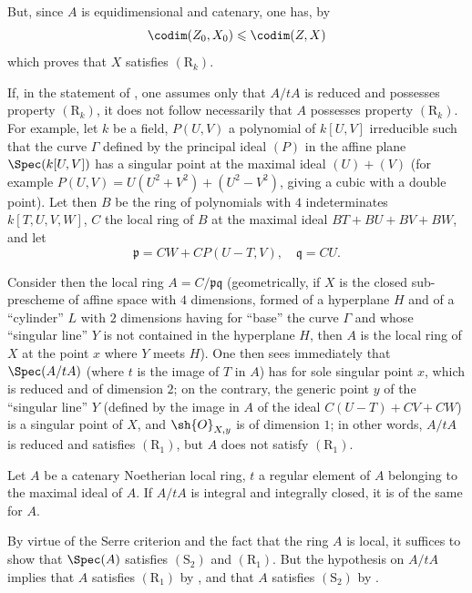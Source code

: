But, since $A$ is equidimensional and catenary, one has, by 
\[
  \codim(Z_0,X_0)\leqslant\codim(Z,X)
\]
which proves that $X$ satisfies $(\mathrm{R}_k)$.

\begin{remark}[5.12.6]
\label{IV.5.12.6}
If, in the statement of , one assumes only that $A/tA$ is reduced and possesses property $(\mathrm{R}_k)$, it does not follow necessarily that $A$ possesses property $(\mathrm{R}_k)$.
For example, let $k$ be a field, $P(U,V)$ a polynomial of $k[U,V]$ irreducible such that the curve $\Gamma$ defined by the principal ideal $(P)$ in the affine plane $\Spec(k[U,V])$ has a singular point at the maximal ideal $(U)+(V)$ (for example $P(U,V)=U(U^2+V^2)+(U^2-V^2)$, giving a cubic with a double point).
Let then $B$ be the ring of polynomials with $4$ indeterminates $k[T,U,V,W]$, $C$ the local ring of $B$ at the maximal ideal $BT+BU+BV+BW$, and let
\[
  \mathfrak{p}=CW+CP(U-T,V),\quad\mathfrak{q}=CU.
\]

Consider then the local ring $A=C/\mathfrak{p}\mathfrak{q}$ (geometrically, if $X$ is the closed sub-prescheme of affine space with $4$ dimensions, formed of a hyperplane $H$ and of a ``cylinder'' $L$ with $2$ dimensions having for ``base'' the curve $\Gamma$ and whose ``singular line'' $Y$ is not contained in the hyperplane $H$, then $A$ is the local ring of $X$ at the point $x$ where $Y$ meets $H$).
One then sees immediately that $\Spec(A/tA)$ (where $t$ is the image of $T$ in $A$) has for sole singular point $x$, which is reduced and of dimension $2$; on the contrary, the generic point $y$ of the ``singular line'' $Y$ (defined by the image in $A$ of the ideal $C(U-T)+CV+CW$) is a singular point of $X$, and $\sh{O}_{X,y}$ is of dimension $1$; in other words, $A/tA$ is reduced and satisfies $(\mathrm{R}_1)$, but $A$ does not satisfy $(\mathrm{R}_1)$.
\end{remark}

\begin{corollary}[5.12.7]
\label{IV.5.12.7}
Let $A$ be a catenary Noetherian local ring, $t$ a regular element of $A$ belonging to the maximal ideal of $A$.
If $A/tA$ is integral and integrally closed, it is of the same for $A$.
\end{corollary}

By virtue of the Serre criterion  and the fact that the ring $A$ is local, it suffices to show that $\Spec(A)$ satisfies $(\mathrm{S}_2)$ and $(\mathrm{R}_1)$.
But the hypothesis on $A/tA$ implies that $A$ satisfies $(\mathrm{R}_1)$ by , and that $A$ satisfies $(\mathrm{S}_2)$ by .


